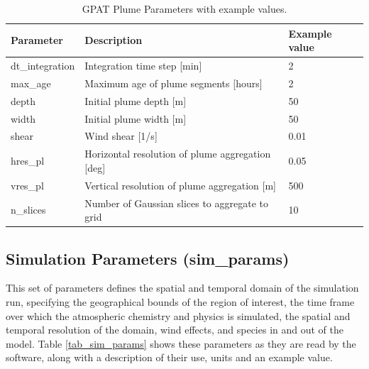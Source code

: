 \begin{table}[H]
\caption{GPAT Plume Parameters with example values.}
\label{tab_plume_params}
\centering
\begin{tabular}{lll}
\hline
\textbf{Parameter}      & \textbf{Description}                                     & \textbf{Example value} \\ \hline
dt\_integration & Integration time step [min]                     & 2             \\
max\_age        & Maximum age of plume segments [hours]           & 2             \\
depth          & Initial plume depth [m]                         & 50            \\
width          & Initial plume width [m]                         & 50            \\
shear          & Wind shear [1/s]                                & 0.01          \\
hres\_pl        & Horizontal resolution of plume aggregation [deg] & 0.05          \\
vres\_pl        & Vertical resolution of plume aggregation [m]   & 500           \\
n\_slices       & Number of Gaussian slices to aggregate to grid  & 10	\\ \hline           
\end{tabular}
\end{table}

\subsection{Simulation Parameters (sim\_params)}
This set of parameters defines the spatial and temporal domain of the simulation run, specifying the geographical bounds of the region of interest, the time frame over which the atmospheric chemistry and physics is simulated, the spatial and temporal resolution of the domain, wind effects, and species in and out of the model. Table \ref{tab_sim_params} shows these parameters as they are read by the software, along with a description of their use, units and an example value.


